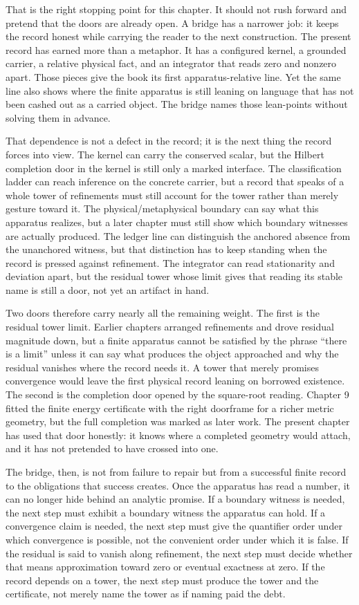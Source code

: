 That is the right stopping point for this chapter. It should not rush forward and
pretend that the doors are already open. A bridge has a narrower job: it keeps the
record honest while carrying the reader to the next construction. The present record
has earned more than a metaphor. It has a configured kernel, a grounded carrier, a
relative physical fact, and an integrator that reads zero and nonzero apart. Those
pieces give the book its first apparatus-relative line. Yet the same line also shows
where the finite apparatus is still leaning on language that has not been cashed out
as a carried object. The bridge names those lean-points without solving them in
advance.

That dependence is not a defect in the record; it is the next thing the record
forces into view. The kernel can carry the conserved scalar, but the Hilbert
completion door in the kernel is still only a marked interface. The classification
ladder can reach inference on the concrete carrier, but a record that speaks of a
whole tower of refinements must still account for the tower rather than merely gesture
toward it. The physical/metaphysical boundary can say what this apparatus realizes,
but a later chapter must still show which boundary witnesses are actually produced.
The ledger line can distinguish the anchored absence from the unanchored witness, but
that distinction has to keep standing when the record is pressed against refinement.
The integrator can read stationarity and deviation apart, but the residual tower whose
limit gives that reading its stable name is still a door, not yet an artifact in hand.

Two doors therefore carry nearly all the remaining weight. The first is the residual
tower limit. Earlier chapters arranged refinements and drove residual magnitude down,
but a finite apparatus cannot be satisfied by the phrase ``there is a limit'' unless
it can say what produces the object approached and why the residual vanishes where the
record needs it. A tower that merely promises convergence would leave the first
physical record leaning on borrowed existence. The second is the completion door
opened by the square-root reading. Chapter 9 fitted the finite energy certificate with
the right doorframe for a richer metric geometry, but the full completion was marked
as later work. The present chapter has used that door honestly: it knows where a
completed geometry would attach, and it has not pretended to have crossed into one.

The bridge, then, is not from failure to repair but from a successful finite record to
the obligations that success creates. Once the apparatus has read a number, it can no
longer hide behind an analytic promise. If a boundary witness is needed, the next step
must exhibit a boundary witness the apparatus can hold. If a convergence claim is
needed, the next step must give the quantifier order under which convergence is
possible, not the convenient order under which it is false. If the residual is said to
vanish along refinement, the next step must decide whether that means approximation
toward zero or eventual exactness at zero. If the record depends on a tower, the next
step must produce the tower and the certificate, not merely name the tower as if
naming paid the debt.

